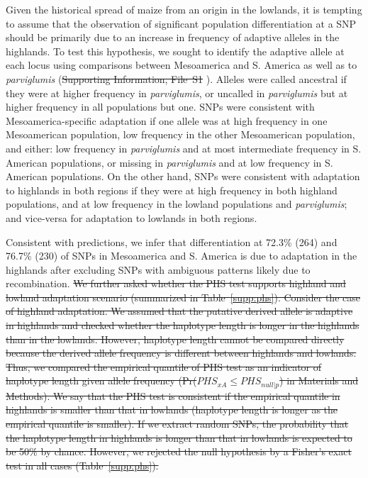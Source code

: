 Given the historical spread of maize from an origin in the lowlands, it is tempting to assume that the observation of significant population differentiation at a SNP should be primarily due to an increase in frequency of adaptive alleles in the highlands.
To test this hypothesis, we sought to identify the adaptive allele at each locus using comparisons between Mesoamerica and S. America as well as to \emph{parviglumis} (\st{Supporting Information, File~S1} ). 
Alleles were called ancestral if they were at higher frequency in \emph{parviglumis}, or uncalled in \emph{parviglumis} but at higher frequency in all populations but one. 
SNPs were consistent with Mesoamerica-specific adaptation if one allele was at high frequency in one Mesoamerican population, low frequency in the other Mesoamerican population, and either: low frequency in \emph{parviglumis} and at most intermediate frequency in S. American populations, or missing in \emph{parviglumis} and at low frequency in S. American populations.
On the other hand, SNPs were consistent with adaptation to highlands in both regions if they were at high frequency in both highland populations, and at low frequency in the lowland populations and \emph{parviglumis}; and vice-versa for adaptation to lowlands in both regions.

Consistent with predictions, we infer that differentiation at 72.3\% (264) and 76.7\% (230) of SNPs in Mesoamerica and S. America is due to adaptation in the highlands after excluding  SNPs with ambiguous patterns likely due to recombination. 
\st{We further asked whether the PHS test supports highland and lowland adaptation scenario (summarized in Table~\ref{supp:phs}).
Consider the case of highland adaptation.
We assumed that the putative derived allele is adaptive in highlands and checked whether the haplotype length is longer in the highlands than in the lowlands.
However, haplotype length cannot be compared directly because the derived allele frequency is different between highlands and lowlands.
Thus, we compared the empirical quantile of PHS test as an indicator of haplotype length given allele frequency (Pr($PHS_{xA}\leq PHS_{null|p}$) in Materials and Methods).
We say that the PHS test is consistent if the empirical quantile in highlands is smaller than that in lowlands (haplotype length is longer as the empirical quantile is smaller).
If we extract random SNPs, the probability that the haplotype length in highlands is longer than that in lowlands is expected to be 50\% by chance.
However, we rejected the null hypothesis by a Fisher's exact test in all cases (Table~\ref{supp:phs}).}

